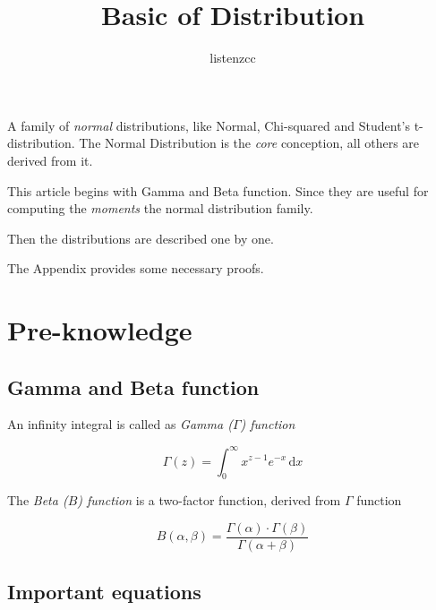 \documentclass[a4paper]{article}
\title{Basic of Distribution}
\author{listenzcc}
\begin{document}
\maketitle

\abstract
A family of \emph{normal} distributions, like
Normal, Chi-squared and Student's t-distribution.
The Normal Distribution is the \emph{core} conception,
all others are derived from it.

This article begins with Gamma and Beta function.
Since they are useful for computing the \emph{moments} the normal distribution family.

Then the distributions are described one by one.

The Appendix provides some necessary proofs.

\tableofcontents

\section{Pre-knowledge}

\subsection{Gamma and Beta function}

An infinity integral is called as \emph{Gamma ($\Gamma$) function}

\begin{equation}
    \Gamma(z) = \int_{0}^{\infty} x^{z-1} e^{-x} \,\mathrm{d}x
\end{equation}

The \emph{Beta ($B$) function} is a two-factor function, derived from $\Gamma$ function

\begin{equation}
    B(\alpha, \beta) = \frac{\Gamma(\alpha) \cdot \Gamma(\beta)}{\Gamma(\alpha + \beta)}
\end{equation}

\subsection{Important equations}
\end{document}
